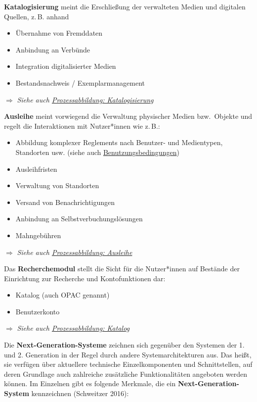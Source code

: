 \documentclass[
  11pt,
  letterpaper,
  DIV=11,
  twoside]{scrreprt}
\begin{document}
\textbf{Katalogisierung} meint die Erschließung der verwalteten Medien
und digitalen Quellen, z.\,B. anhand

\begin{itemize}
\item
  Übernahme von Fremddaten
\item
  Anbindung an Verbünde
\item
  Integration digitalisierter Medien
\item
  Bestandsnachweis / Exemplarmanagement
\end{itemize}

\(\Rightarrow\) \emph{Siehe auch
\hyperref[katalogisierung-prozess]{Prozessabbildung: Katalogisierung}}

\textbf{Ausleihe} meint vorwiegend die Verwaltung physischer Medien
bzw.~Objekte und regelt die Interaktionen mit Nutzer*innen wie z.\,B.:

\begin{itemize}
\item
  Abbildung komplexer Reglements nach Benutzer- und Medientypen,
  Standorten usw. (siehe auch
  \hyperref[benutzungsbedingungen]{Benutzungsbedingungen})
\item
  Ausleihfristen
\item
  Verwaltung von Standorten
\item
  Versand von Benachrichtigungen
\item
  Anbindung an Selbstverbuchungslösungen
\item
  Mahngebühren
\end{itemize}

\(\Rightarrow\) \emph{Siehe auch
\hyperref[ausleihe-prozess]{Prozessabbildung: Ausleihe}}

Das \textbf{Recherchemodul} stellt die Sicht für die Nutzer*innen auf
Bestände der Einrichtung zur Recherche und Kontofunktionen dar:

\begin{itemize}
\item
  Katalog (auch OPAC genannt)
\item
  Benutzerkonto
\end{itemize}

\(\Rightarrow\) \emph{Siehe auch
\hyperref[katalog-prozess]{Prozessabbildung: Katalog}}

Die \textbf{Next-Generation-Systeme} zeichnen sich gegenüber den
Systemen der 1. und 2. Generation in der Regel durch andere
Systemarchitekturen aus. Das heißt, sie verfügen über aktuellere
technische Einzelkomponenten und Schnittstellen, auf deren Grundlage
auch zahlreiche zusätzliche Funktionalitäten angeboten werden können. Im
Einzelnen gibt es folgende Merkmale, die ein
\textbf{Next-Generation-System} kennzeichnen (Schweitzer 2016):
\end{document}

